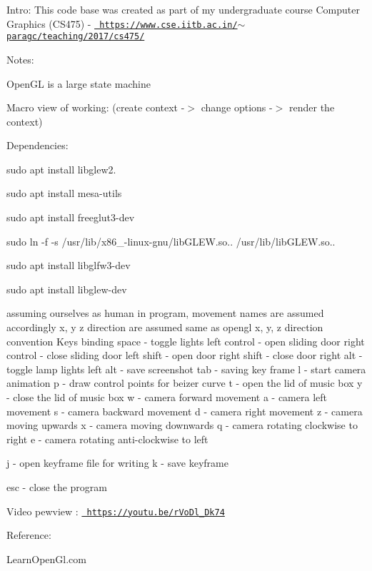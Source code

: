 Intro\+: This code base was created as part of my undergraduate course Computer Graphics (C\+S475) -\/ \href{https://www.cse.iitb.ac.in/~paragc/teaching/2017/cs475/}{\texttt{ https\+://www.\+cse.\+iitb.\+ac.\+in/$\sim$paragc/teaching/2017/cs475/}}

Notes\+:
\begin{DoxyEnumerate}
\item Open\+GL is a large state machine
\item Macro view of working\+: (create context -\/$>$ change options -\/$>$ render the context)
\end{DoxyEnumerate}

Dependencies\+:
\begin{DoxyEnumerate}
\item sudo apt install libglew2.
\item sudo apt install mesa-\/utils
\item sudo apt install freeglut3-\/dev
\item sudo ln -\/f -\/s /usr/lib/x86\+\_-\/linux-\/gnu/lib\+G\+L\+EW.so.. /usr/lib/lib\+G\+L\+EW.so..
\item sudo apt install libglfw3-\/dev
\item sudo apt install libglew-\/dev
\end{DoxyEnumerate}

assuming ourselves as human in program, movement names are assumed accordingly x, y z direction are assumed same as opengl x, y, z direction convention Keys binding space -\/ toggle lights left control -\/ open sliding door right control -\/ close sliding door left shift -\/ open door right shift -\/ close door right alt -\/ toggle lamp lights left alt -\/ save screenshot tab -\/ saving key frame l -\/ start camera animation p -\/ draw control points for beizer curve t -\/ open the lid of music box y -\/ close the lid of music box w -\/ camera forward movement a -\/ camera left movement s -\/ camera backward movement d -\/ camera right movement z -\/ camera moving upwards x -\/ camera moving downwards q -\/ camera rotating clockwise to right e -\/ camera rotating anti-\/clockwise to left

j -\/ open keyframe file for writing k -\/ save keyframe

esc -\/ close the program

Video pewview \+: \href{https://youtu.be/rVoDl_9Dk74}{\texttt{ https\+://youtu.\+be/r\+Vo\+Dl\+\_\+Dk74}}

Reference\+:
\begin{DoxyEnumerate}
\item Learn\+Open\+Gl.\+com 
\end{DoxyEnumerate}